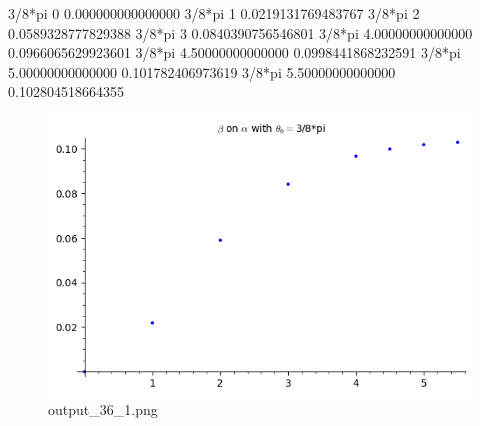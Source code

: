 \documentclass[11pt]{article}
\begin{document}

3/8*pi 0 0.000000000000000
3/8*pi 1 0.0219131769483767
3/8*pi 2 0.0589328777829388
3/8*pi 3 0.0840390756546801
3/8*pi 4.00000000000000 0.0966065629923601
3/8*pi 4.50000000000000 0.0998441868232591
3/8*pi 5.00000000000000 0.101782406973619
3/8*pi 5.50000000000000 0.102804518664355
    
\begin{figure}
\centering
\includegraphics{output_36_1.png}
\caption{output\_36\_1.png}
\end{figure}
\end{document}
